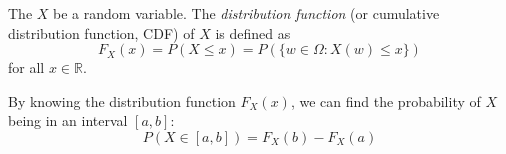 \begin{definition}
    The $X$ be a random variable. The \emph{distribution function} (or cumulative distribution function, CDF) of $X$ is defined as
    \[
        F_X(x) = P(X \leq x) = P(\{w \in \Omega: X(w) \leq x\})
    \]
    for all $x \in \mathbb{R}$.
\end{definition}

By knowing the distribution function $F_X(x)$, we can find the probability of $X$ being in an interval $[a, b]$:
\begin{equation}
    \label{eq:probability-interval}
    P(X \in [a, b]) = F_X(b) - F_X(a)
\end{equation}